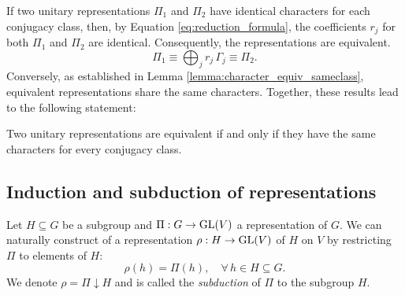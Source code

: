 If two unitary representations \(\Pi_1\) and \(\Pi_2\) have identical characters for each conjugacy class, then, by Equation \ref{eq:reduction_formula}, the coefficients \(r_j\) for both \(\Pi_1\) and \(\Pi_2\) are identical. Consequently, the representations are equivalent.
\begin{equation} \label{eq:Phi_Psi_rj_equivalent}
\Pi_1 \equiv \bigoplus_j r_j \, \Gamma_j \equiv \Pi_2.
\end{equation}
Conversely, as established in Lemma \ref{lemma:character_equiv_sameclass}, equivalent representations share the same characters. Together, these results lead to the following statement:

\begin{corollary} \label{coro:same_characters_equiv_reps}
Two unitary representations are equivalent if and only if they have the same characters for every conjugacy class.
\end{corollary}


\subsection{Induction and subduction of representations} \label{sec:induction_subsuction}

\begin{definition} \label{def:subduction_defi}
Let $H \subseteq G$ be a subgroup and $\Pi: G \to {\text{GL}}(V)$ a representation of $G$. We can naturally construct of a representation $\rho: H \to {\text{GL}}(V)$ of $H$ on $V$ by restricting $\Pi$ to elements of $H$:
\begin{equation} \label{eq:subduction_defi}
\rho(h) = \Pi(h), \quad \forall \, h \in H \subseteq G.
\end{equation}
We denote $\rho = \Pi \downarrow H$ and is called the \textit{subduction} of $\Pi$ to the subgroup $H$.
\end{definition}

